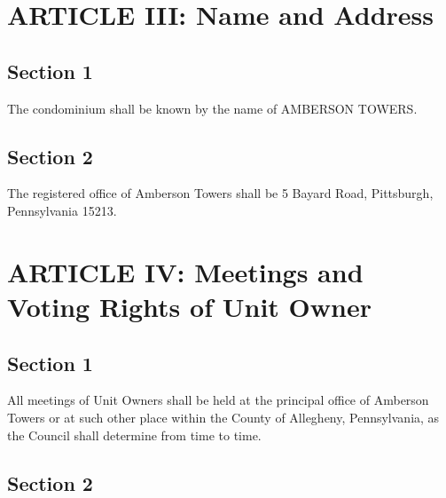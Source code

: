 \documentclass[
  14pt,
]{book}
\begin{document}
\hypertarget{article-iii-name-and-address}{%
\section*{ARTICLE III: Name and Address}\label{article-iii-name-and-address}}

\hypertarget{section-1-2}{%
\subsection*{Section 1}\label{section-1-2}}

The condominium shall be known by the name of AMBERSON TOWERS.

\hypertarget{section-2-2}{%
\subsection*{Section 2}\label{section-2-2}}

The registered office of Amberson Towers shall be 5 Bayard Road, Pittsburgh, Pennsylvania 15213.

\hypertarget{article-iv-meetings-and-voting-rights-of-unit-owner}{%
\section*{ARTICLE IV: Meetings and Voting Rights of Unit Owner}\label{article-iv-meetings-and-voting-rights-of-unit-owner}}

\hypertarget{section-1-3}{%
\subsection*{Section 1}\label{section-1-3}}

All meetings of Unit Owners shall be held at the principal office of Amberson Towers or at such other place within the County of Allegheny, Pennsylvania, as the Council shall determine from time to time.

\hypertarget{section-2-3}{%
\subsection*{Section 2}\label{section-2-3}}
\end{document}
